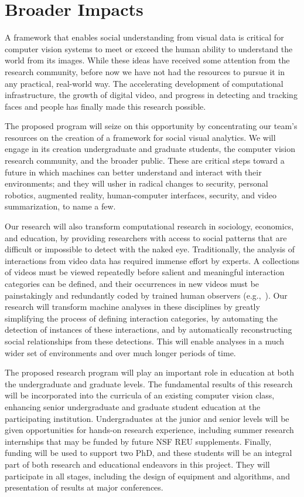 \vspace{-8pt}
\section{Broader Impacts}
\label{sec:impacts}
\vspace{-8pt}
A framework that enables social understanding from visual data is critical for computer vision systems to meet or exceed the human ability to understand the world from its images. While these ideas have received some attention from the research community, before now we have not had the resources to pursue it in any practical, real-world way. The accelerating development of computational infrastructure, the growth of digital video, and progress in detecting and tracking faces and people has finally made this research possible. 

The proposed  program will seize on this opportunity by concentrating our team's resources on the creation of a  framework for social visual analytics.  We will engage in its creation undergraduate and graduate students, the computer vision research community, and the broader public. These are critical steps toward a future in which machines can better understand and interact with their environments; and they will usher in radical changes to security, personal robotics, augmented reality, human-computer interfaces, security, and video summarization, to name a few.

Our research will also transform computational research in sociology, economics, and education, by providing researchers with access to social patterns that are difficult or impossible to detect with the naked eye. Traditionally, the analysis of interactions from video data has required immense effort by experts. A collections of videos must be viewed repeatedly before salient and meaningful interaction categories can be defined, and their occurrences in new videos must be painstakingly and redundantly coded by trained human observers (e.g.,~\cite{Scherr2009}). Our research will transform machine analyses in these disciplines by greatly simplifying the process of defining interaction categories, by automating the detection of instances of these interactions, and by automatically reconstructing social relationships from these detections. This will enable analyses in a much wider set of environments and over much longer periods of time.

The proposed research program will play an important role in education at both the undergraduate and graduate levels. The fundamental results of this research will be incorporated into the curricula of an existing computer vision class, enhancing senior undergraduate and graduate student education at the participating institution. Undergraduates at the junior and senior levels will be given opportunities for hands-on research experience, including summer research internships that may be funded by future NSF REU supplements. Finally, funding will be used to support two PhD, and these students will be an integral part of both research and educational endeavors in this project. They will participate in all stages, including the design of equipment and algorithms, and presentation of results at major conferences.

